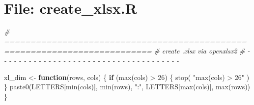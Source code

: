 \documentclass[
]{article}
\newenvironment{Shaded}{\begin{snugshade}}{\end{snugshade}}
\newcommand{\CommentTok}[1]{\textcolor[rgb]{0.56,0.35,0.01}{\textit{#1}}}
\newcommand{\ControlFlowTok}[1]{\textcolor[rgb]{0.13,0.29,0.53}{\textbf{#1}}}
\newcommand{\DecValTok}[1]{\textcolor[rgb]{0.00,0.00,0.81}{#1}}
\newcommand{\FunctionTok}[1]{\textcolor[rgb]{0.00,0.00,0.00}{#1}}
\newcommand{\NormalTok}[1]{#1}
\newcommand{\OtherTok}[1]{\textcolor[rgb]{0.56,0.35,0.01}{#1}}
\newcommand{\SpecialCharTok}[1]{\textcolor[rgb]{0.00,0.00,0.00}{#1}}
\newcommand{\StringTok}[1]{\textcolor[rgb]{0.31,0.60,0.02}{#1}}
\begin{document}
\hypertarget{file-create_xlsx.r}{%
\section{File: create\_xlsx.R}\label{file-create_xlsx.r}}

\begin{Shaded}
\begin{Highlighting}[]
\CommentTok{\# ==========================================================================}
\CommentTok{\# create .xlsx via openxlsx2}
\CommentTok{\# {-} {-} {-} {-} {-} {-} {-} {-} {-} {-} {-} {-} {-} {-} {-} {-} {-} {-} {-} {-} {-} {-} {-} {-} {-} {-} {-} {-} {-} {-} {-} {-} {-} {-} {-} {-} {-}}

\NormalTok{xl\_dim }\OtherTok{\textless{}{-}} \ControlFlowTok{function}\NormalTok{(rows, cols) \{}
  \ControlFlowTok{if}\NormalTok{ (}\FunctionTok{max}\NormalTok{(cols) }\SpecialCharTok{\textgreater{}} \DecValTok{26}\NormalTok{) \{}
    \FunctionTok{stop}\NormalTok{( }\StringTok{"max(cols) \textgreater{} 26"}\NormalTok{ )}
\NormalTok{  \}}
  \FunctionTok{paste0}\NormalTok{(LETTERS[}\FunctionTok{min}\NormalTok{(cols)], }\FunctionTok{min}\NormalTok{(rows),}
    \StringTok{":"}\NormalTok{, LETTERS[}\FunctionTok{max}\NormalTok{(cols)], }\FunctionTok{max}\NormalTok{(rows))}
\NormalTok{\}}


\end{Highlighting}
\end{Shaded}
\end{document}
